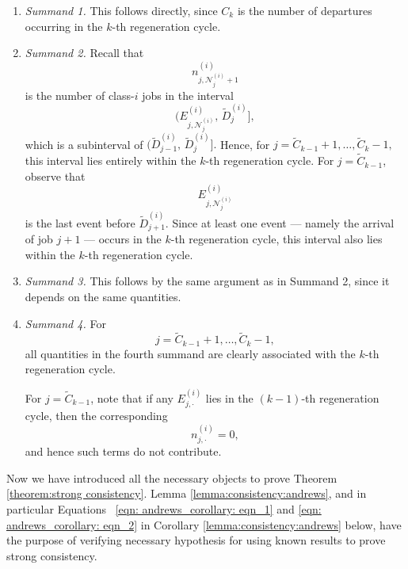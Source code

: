 \documentclass[11pt]{article}
\newcommand{\jp}[1]{\footnote{J-P: #1}}
\theoremstyle{remark}
\theoremstyle{definition}
\numberwithin{equation}{section}
\begin{document}
\begin{enumerate}

\item \textit{Summand 1.}
This follows directly, since $C_k$ is the number of departures occurring in the $k$-th regeneration cycle.

\item \textit{Summand 2.}
Recall that
\[
n^{(i)}_{j,\mathscr{N}^{(i)}_{j}+1}
\]
is the number of class-$i$ jobs in the interval
\[
\Big( E^{(i)}_{j,\mathscr{N}^{(i)}_{j}},\,\widetilde{D}^{(i)}_{j} \Big],
\]
which is a subinterval of
$
\Big(\widetilde{D}^{(i)}_{j-1},\, \widetilde{D}^{(i)}_{j}\Big].$
Hence, for
$ j = \widetilde{C}_{k-1}+1, \ldots, \widetilde{C}_k-1,$
this interval lies entirely within the $k$-th regeneration cycle.
For $j = \widetilde{C}_{k-1}$, observe that
\[ E^{(i)}_{j,\mathscr{N}^{(i)}_{j}} \]
is the last event before $\widetilde{D}^{(i)}_{j+1}$. Since at least one event — namely the arrival of job $j+1$ — occurs in the $k$-th regeneration cycle, this interval also lies within the $k$-th regeneration cycle.

\item \textit{Summand 3.}
This follows by the same argument as in Summand 2, since it depends on the same quantities.

\item \textit{Summand 4.}
For
\[
j = \widetilde{C}_{k-1}+1, \ldots, \widetilde{C}_k-1,
\]
all quantities in the fourth summand are clearly associated with the $k$-th regeneration cycle.

For $j = \widetilde{C}_{k-1}$, note that if any
$
E^{(i)}_{j,\cdot}
$
lies in the $(k-1)$-th regeneration cycle, then the corresponding
\[
n^{(i)}_{j,\cdot} = 0,
\]
and hence such terms do not contribute.

\end{enumerate}

Now we have introduced all the necessary objects to prove Theorem \ref{theorem:strong consistency}.
Lemma \ref{lemma:consistency:andrews}, and in particular Equations \ \eqref{eqn: andrews_corollary: eqn_1} and \eqref{eqn: andrews_corollary: eqn_2} in Corollary \ref{lemma:consistency:andrews} below, have the purpose of verifying necessary hypothesis for using known results to prove strong consistency.
\end{document}

